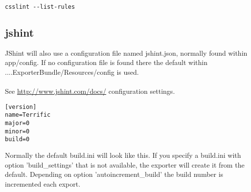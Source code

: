 \begin{verbatim}
csslint --list-rules
\end{verbatim}

\subsection{jshint}
JShint will also use a configuration file named jshint.json, normally found within app/config. If no configuration file is found there the default within ....ExporterBundle/Resources/config is used.\\
\\
See \url{http://www.jshint.com/docs/} configuration settings.\\


\begin{verbatim}
[version]
name=Terrific
major=0
minor=0
build=0
\end{verbatim}
\noindent Normally the default build.ini will look like this. If you specify a build.ini with option 'build\_settings' that is not available, the exporter will create it from the default. Depending on option 'autoincrement\_build' the build number is incremented each export.

